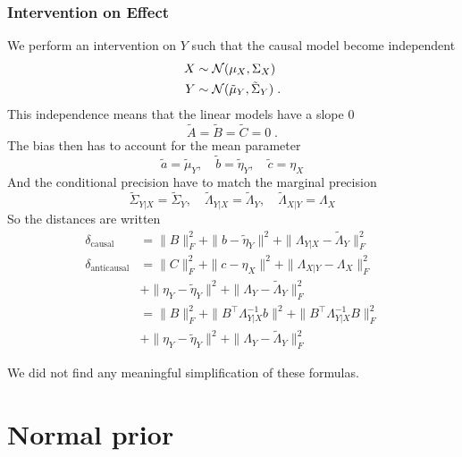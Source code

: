 \begin{subappendices}
 \subsubsection{Intervention on Effect}
We perform an intervention on $Y$ such that the causal model become independent
\begin{align*}
    X &\sim {\mathcal N}(\mu_X, \Sigma_X) \\
    Y &\sim {\mathcal N}(\tilde \mu_Y, \tilde \Sigma_{Y}) \; .
\end{align*}
This independence means that the linear models have a slope 0
\begin{equation}
\tilde A= \tilde B = \tilde C = 0 \; .
\end{equation}
The bias then has to account for the mean parameter
\begin{equation}
    \tilde a = \tilde \mu_Y,
    \quad \tilde b = \tilde \eta_Y,
    \quad \tilde c = \eta_X
\end{equation}
And the conditional precision have to match the marginal precision
\begin{equation}
    \tilde \Sigma_{Y|X} = \tilde \Sigma_Y ,
    \quad \tilde \Lambda_{Y|X} = \tilde \Lambda_Y,
    \quad \tilde \Lambda_{X|Y} = \Lambda_X
\end{equation}
So the distances are written
\begin{align*}
    \delta_\text{causal}
    &= \|B\|_F^2
    + \|b - \tilde \eta_Y\|^2 
    +  \|\Lambda_{Y|X} - \tilde \Lambda_Y \|^2_F \\
    \delta_\text{anticausal}
    &= \|C\|_F^2
    + \|c - \eta_X \|^2
    + \|\Lambda_{X|Y} - \Lambda_X \|^2_F\\
    &+ \| \eta_Y - \tilde \eta_Y \|^2
    + \| \Lambda_Y - \tilde \Lambda_Y \|_F^ 2 \\
    &= \|B\|_F^2
    + \|B^\top\Lambda_{Y|X}^{-1}b \|^2
    + \|B^\top\Lambda_{Y|X}^{-1}B\|^2_F\\
    &+ \| \eta_Y - \tilde \eta_Y \|^2
    + \| \Lambda_Y - \tilde \Lambda_Y \|_F^ 2
\end{align*}

We did not find any meaningful simplification of these formulas. 
 
\section{{Normal prior}}
\label{apdx:normal_experiments}
 

\end{subappendices}
